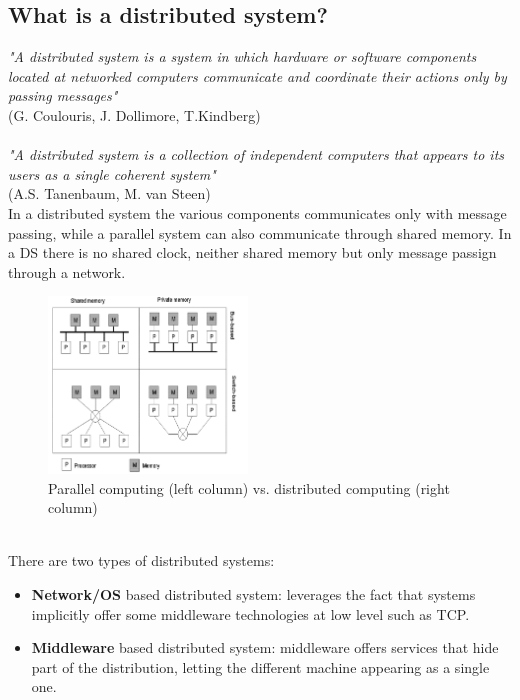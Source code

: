 \documentclass[10pt,a4paper]{article}
\begin{document}
\subsection{What is a distributed system?}
\textit{"A distributed system is a system in which hardware or software components located at networked computers communicate and coordinate their actions only by passing messages"} \\ (G. Coulouris, J. Dollimore, T.Kindberg) \\ \\
\textit{"A distributed system is a collection of independent computers that appears to its users as a single coherent system"} \\ (A.S. Tanenbaum, M. van Steen) \\
In a distributed system the various components communicates only with message passing, while a parallel system can also communicate through shared memory. In a DS there is no shared clock, neither shared memory but only message passign through a network. \pagebreak
 \begin{figure}[h!]
 \hfill \includegraphics[width=150pt]{images/par_dis.png}\hspace*{\fill}
  \caption{Parallel computing (left column) vs. distributed computing (right column)}
  \label{fig:par_dis}
\end{figure} \\
There are two types of distributed systems:
\begin{itemize}
	\item \textbf{Network/OS} based distributed system: leverages the fact that systems implicitly offer some middleware technologies at low level such as TCP.
	\item \textbf{Middleware} based distributed system: middleware offers services that hide part of the distribution, letting the different machine appearing as a single one.
\end{itemize}
\end{document}

